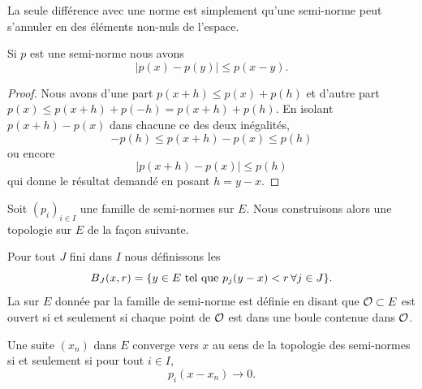 La seule différence avec une norme est simplement qu'une semi-norme peut s'annuler en des éléments non-nuls de l'espace.

\begin{lemma}
    Si \( p\) est une semi-norme nous avons
    \begin{equation}
        | p(x)-p(y) |\leq p(x-y).
    \end{equation}
\end{lemma}

\begin{proof}
    Nous avons d'une part \( p(x+h)\leq p(x)+p(h)\) et d'autre part \( p(x)\leq p(x+h)+p(-h)=p(x+h)+p(h)\). En isolant \( p(x+h)-p(x)\) dans chacune ce des deux inégalités,
    \begin{equation}
        -p(h)\leq p(x+h)-p(x)\leq p(h)
    \end{equation}
    ou encore
    \begin{equation}
        |p(x+h)-p(x)|\leq p(h)
    \end{equation}
    qui donne le résultat demandé en posant \( h=y-x\).
\end{proof}

Soit \( (p_i)_{i\in I}\) une famille de semi-normes sur \( E\). Nous construisons alors une topologie sur \( E\) de la façon suivante.

\begin{definition}
    Pour tout \( J\) fini dans \( I\) nous définissons les 
    \begin{equation}
        B_J(x,r)=\{ y\in E\text{ tel que } p_j(y-x)<r\,\forall j\in J \}.
    \end{equation}
    La  sur \( E\) donnée par la famille de semi-norme est définie en disant que \( \mathcal{O}\subset E\) est ouvert si et seulement si chaque point de \( \mathcal{O}\) est dans une boule contenue dans \( \mathcal{O}\).
\end{definition}

\begin{proposition} \label{PropQPzGKVk}
    Une suite \( (x_n)\) dans \( E\) converge vers \( x\) au sens de la topologie des semi-normes si et seulement si pour tout \( i\in I\),
    \begin{equation}
        p_i(x-x_n)\to 0.
    \end{equation}
\end{proposition}

